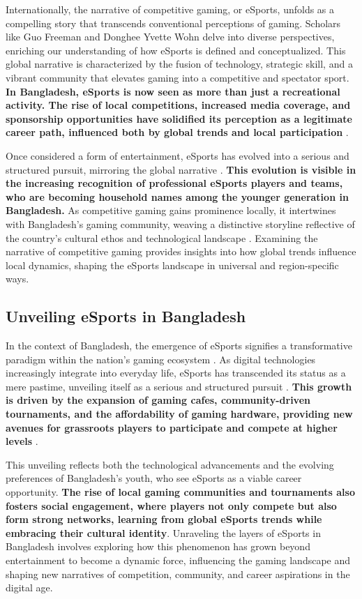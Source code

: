 \documentclass[manuscript,screen,review,anonymous]{acmart}
\begin{document}
Internationally, the narrative of competitive gaming, or eSports, unfolds as a compelling story that transcends conventional perceptions of gaming. Scholars like Guo Freeman and Donghee Yvette Wohn \cite{a3} delve into diverse perspectives, enriching our understanding of how eSports is defined and conceptualized. This global narrative is characterized by the fusion of technology, strategic skill, and a vibrant community that elevates gaming into a competitive and spectator sport. \textbf{In Bangladesh, eSports is now seen as more than just a recreational activity. The rise of local competitions, increased media coverage, and sponsorship opportunities have solidified its perception as a legitimate career path, influenced both by global trends and local participation} \cite{Islam2015Identification}.

Once considered a form of entertainment, eSports has evolved into a serious and structured pursuit, mirroring the global narrative \cite{a5}. \textbf{This evolution is visible in the increasing recognition of professional eSports players and teams, who are becoming household names among the younger generation in Bangladesh.} As competitive gaming gains prominence locally, it intertwines with Bangladesh's gaming community, weaving a distinctive storyline reflective of the country's cultural ethos and technological landscape \cite{Ali2017Impact,Islam2015Identification}. Examining the narrative of competitive gaming provides insights into how global trends influence local dynamics, shaping the eSports landscape in universal and region-specific ways.

\subsection{Unveiling eSports in Bangladesh} 

In the context of Bangladesh, the emergence of eSports signifies a transformative paradigm within the nation's gaming ecosystem \cite{Szillat2020Introduction}. As digital technologies increasingly integrate into everyday life, eSports has transcended its status as a mere pastime, unveiling itself as a serious and structured pursuit \cite{Edgar2019Esport}. \textbf{This growth is driven by the expansion of gaming cafes, community-driven tournaments, and the affordability of gaming hardware, providing new avenues for grassroots players to participate and compete at higher levels} \cite{Funk2017eSport}.

This unveiling reflects both the technological advancements and the evolving preferences of Bangladesh’s youth, who see eSports as a viable career opportunity. \textbf{The rise of local gaming communities and tournaments also fosters social engagement, where players not only compete but also form strong networks, learning from global eSports trends while embracing their cultural identity}. Unraveling the layers of eSports in Bangladesh involves exploring how this phenomenon has grown beyond entertainment to become a dynamic force, influencing the gaming landscape and shaping new narratives of competition, community, and career aspirations in the digital age.
\end{document}
